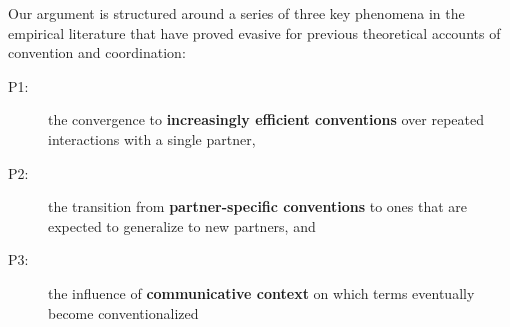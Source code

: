 
Our argument is structured around a series of three key phenomena in the empirical literature that have proved evasive for previous theoretical accounts of convention and coordination: 
\begin{description}
\item[P1:] the convergence to \textbf{increasingly efficient conventions} over repeated interactions with a single partner,
\item[P2:] the transition from \textbf{partner-specific conventions} to ones that are expected to generalize to new partners, and
\item[P3:] the influence of \textbf{communicative context} on which terms eventually become conventionalized 
\end{description}

